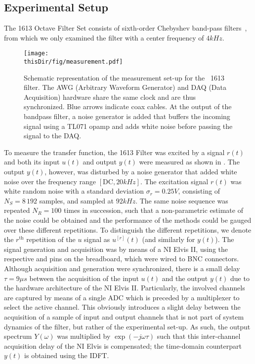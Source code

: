 \subsection{Experimental Setup}
The \BK{} 1613 Octave Filter Set consists of sixth-order Chebyshev band-pass filters~\citep{datasheet_bk1613}, from which we only examined the filter with a center frequency of $4\unit{kHz}$.

\begin{figure}
  \centering
  \texttt{[image: \\thisDir/fig/measurement.pdf]}
  \caption[Measurement schematic of \BK\ 1613 filter.]{Schematic representation of the measurement set-up for the \BK\ 1613 filter. The AWG (Arbitrary Waveform Generator) and DAQ (Data Acquisition) hardware share the same clock and are thus synchronized. 
  Blue arrows indicate coax cables. 
  At the output of the bandpass filter, a noise generator is added that buffers the incoming signal using a TL071 opamp and adds white noise before passing the signal to the DAQ.} 
  \label{fig:measurementSetup}
\end{figure}


To measure the transfer function, the \BK{} 1613 Filter was excited by a signal $r(t)$ and both its input $u(t)$ and output $y(t)$ were measured as shown in .
The output $y(t)$, however, was disturbed by a noise generator that added white noise over the frequency range $[\mathrm{DC}, 20\unit{kHz}]$.
The excitation signal $r(t)$ was white random noise with a standard deviation $\sigma_r = 0.25 \unit{V}$, consisting of $N_S = 8\,192$ samples, and sampled at $92 \unit{kHz}$.
The same noise sequence was repeated $N_R = 100$ times in succession, such that a non-parametric estimate of the noise could be obtained and the performance of the methods could be gauged over these different repetitions.
To distinguish the different repetitions, we denote the $r^{\text{th}}$ repetition of the $u$ signal as $u^{[r]}(t)$ (and similarly for $y(t)$).
The signal generation and acquisition was by means of a \gls{NI} Elvis II, using the respective  and  pins on the breadboard, which were wired to BNC connectors.
Although acquisition and generation were synchronized, there is a small delay $\tau = 9\unit{\mu s}$ between the acquisition of the input $u(t)$ and the output $y(t)$ due to the hardware architecture of the \gls{NI} Elvis II.
Particularly, the involved channels are captured by means of a single \gls{ADC} which is preceded by a multiplexer to select the active channel.
This obviously introduces a slight delay between the acquisition of a sample of input and output channels that is not part of system dynamics of the \BK{} filter, but rather of the experimental set-up.
As such, the output spectrum $Y(\omega)$ was multiplied by $\exp\left(-j\omega\tau \right)$ such that this inter-channel acquisition delay of the \gls{NI} Elvis is compensated; the time-domain counterpart $y(t)$ is obtained using the \gls{IDFT}.


